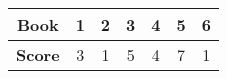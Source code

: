 \begin{tabular}{ccccccc}
  \toprule
  \textbf{Book}  & 1 & 2 & 3 & 4 & 5 & 6 \\ \midrule
  \textbf{Score} & 3 & 1 & 5 & 4 & 7 & 1 \\
  \bottomrule
\end{tabular}